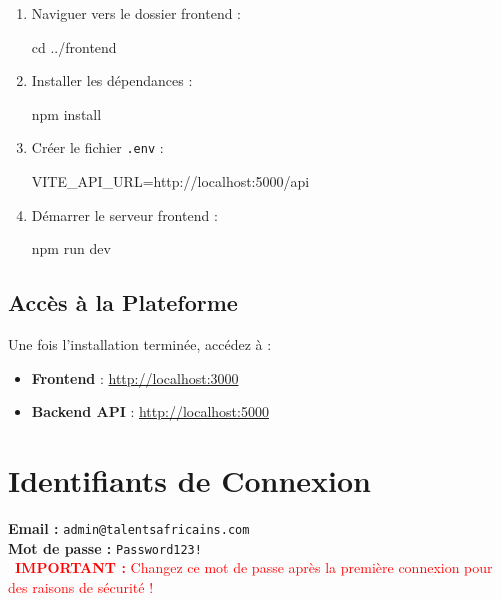 \documentclass[12pt,a4paper]{article}
\begin{document}
\begin{enumerate}[leftmargin=*]
    \item Naviguer vers le dossier frontend :
    \begin{tcolorbox}[colback=darkcolor!5, colframe=darkcolor, fonttitle=\ttfamily]
    cd ../frontend
    \end{tcolorbox}
    
    \item Installer les dépendances :
    \begin{tcolorbox}[colback=darkcolor!5, colframe=darkcolor, fonttitle=\ttfamily]
    npm install
    \end{tcolorbox}
    
    \item Créer le fichier \texttt{.env} :
    \begin{tcolorbox}[colback=darkcolor!5, colframe=darkcolor, fonttitle=\ttfamily]
    VITE\_API\_URL=http://localhost:5000/api
    \end{tcolorbox}
    
    \item Démarrer le serveur frontend :
    \begin{tcolorbox}[colback=darkcolor!5, colframe=darkcolor, fonttitle=\ttfamily]
    npm run dev
    \end{tcolorbox}
\end{enumerate}

\subsection{Accès à la Plateforme}

Une fois l'installation terminée, accédez à :
\begin{itemize}[leftmargin=*]
    \item \textbf{Frontend} : \url{http://localhost:3000}
    \item \textbf{Backend API} : \url{http://localhost:5000}
\end{itemize}

\newpage
\section{Identifiants de Connexion}

\begin{credentialbox}
\Large
\textbf{Email :} \texttt{admin@talentsafricains.com}\\[0.3cm]
\textbf{Mot de passe :} \texttt{Password123!}\\[0.5cm]

\normalsize
\textcolor{red}{\faExclamationTriangle\ \textbf{IMPORTANT :} Changez ce mot de passe après la première connexion pour des raisons de sécurité !}
\end{credentialbox}
\end{document}
